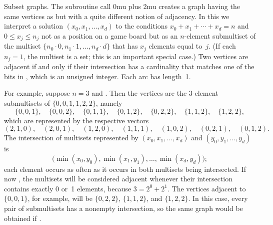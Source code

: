 Subset graphs. The subroutine call {\advance\thinmuskip 0mu plus 2mu
}
creates a graph having the same vertices as
 but
with a quite different notion
of adjacency. In this we interpret a solution $(x_0,x_1,\ldots,x_d)$ to
the conditions $x_0+x_1+\cdots+x_d=n$ and $0\le x_j\le n_j$ not as a
position on a game board but as an $n$-element submultiset of the multiset
$\{n_0\cdot0,n_1\cdot 1,\ldots,n_d\cdot d\}$ that has $x_j$ elements
equal to~$j$. (If each $n_j=1$, the multiset is a set; this is an
important special case.) Two vertices are adjacent if and only if
their intersection has a cardinality that matches one of the bits in
, which is an unsigned integer. Each arc has length~1.

For example, suppose $n=3$ and . Then the vertices
are the 3-element submultisets of $\{0,0,1,1,2,2\}$, namely
$$\{0,0,1\},\quad \{0,0,2\},\quad \{0,1,1\},\quad \{0,1,2\},\quad
\{0,2,2\},\quad \{1,1,2\},\quad \{1,2,2\},$$
which are represented by the respective vectors
$$(2,1,0),\quad (2,0,1),\quad (1,2,0),\quad (1,1,1),\quad
(1,0,2),\quad (0,2,1),\quad (0,1,2).$$
The intersection of multisets represented by $(x_0,x_1,\ldots,x_d)$ and
$(y_0,y_1,\ldots,y_d)$ is $$\bigl(\min(x_0,y_0),\min(x_1,y_1),\ldots,
\min(x_d,y_d)\bigr);$$ each element occurs as often as it occurs
in both multisets being intersected. If now , the
multisets will be considered adjacent whenever their
intersection contains exactly 0 or~1 elements, because $3=2^0+2^1$.
The vertices adjacent to $\{0,0,1\}$, for example, will be
$\{0,2,2\}$, $\{1,1,2\}$,
and $\{1,2,2\}$. In this case, every pair of submultisets
has a nonempty intersection, so the same graph would be obtained
if .

